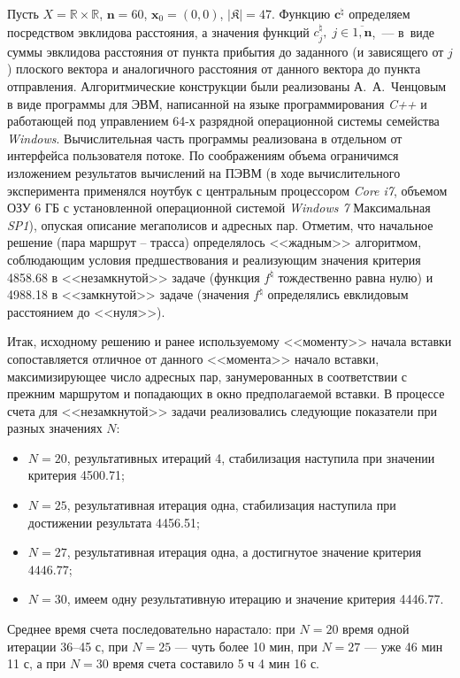 Пусть
$X=\mathbb{R}\times\mathbb{R}$, $\mathbf{n}=60$,
$\mathbf{x}_0=(0,0)$,
$\vert \mathfrak{K} \vert=47$.
Функцию $\mathbf{c}^{\natural}$
определяем посредством эвклидова расстояния,
а значения функций
$c_j^{\natural},\;j \in \overline{1,\mathbf{n}}$,~---
в~виде суммы эвклидова расстояния от пункта прибытия до заданного
(и зависящего от $j$)
плоского вектора и аналогичного расстояния от данного
вектора до пункта отправления.
Алгоритмические конструкции были реализованы
А.~А.~Ченцовым в виде программы для ЭВМ,
написанной на языке программирования {\it C++}
и работающей под управлением 64-х разрядной операционной
системы семейства {\it Windows}.
Вычислительная часть программы реализована в отдельном от интерфейса пользователя потоке.
По соображениям объема ограничимся изложением результатов вычислений на ПЭВМ
(в ходе вычислительного эксперимента применялся ноутбук с центральным процессором
{\it Core i7}, объемом ОЗУ 6 ГБ
с установленной операционной системой
{\it Windows 7} Максимальная {\it SP1}),
опуская описание мегаполисов и адресных пар.
Отметим, что
начальное решение (пара маршрут -- трасса)
определялось <<жадным>> алгоритмом, соблюдающим условия предшествования
и реализующим значения критерия 4858.68 в <<незамкнутой>> задаче
(функция $f^{\natural}$ тождественно равна нулю)
и 4988.18 в <<замкнутой>> задаче
(значения $f^{\natural}$ определялись евклидовым расстоянием до <<нуля>>).

Итак, исходному решению и ранее используемому <<моменту>> начала
вставки сопоставляется отличное от данного <<момента>> начало вставки,
максимизирующее число адресных пар,
занумерованных в соответствии с прежним маршрутом и попадающих в
окно предполагаемой вставки.
В процессе счета для <<незамкнутой>> задачи
реализовались следующие показатели
при разных значениях $N$:

\begin{itemize}
  \item
  $N=20$, результативных итераций 4, стабилизация наступила при значении критерия 4500.71;
  \item
  $N=25$, результативная итерация одна, стабилизация наступила при достижении результата 4456.51;
  \item
  $N=27$, результативная итерация одна, а достигнутое значение критерия $4446.77$;
  \item
  $N=30$, имеем одну результативную итерацию и значение критерия 4446.77.
\end{itemize}

Среднее время счета последовательно нарастало:
при $N=20$ время одной итерации 36--45 с,
при $N=25$ --- чуть более 10 мин,
при $N=27$ --- уже 46 мин 11 с,
а при $N=30$ время счета составило 5 ч 4 мин 16 с.

